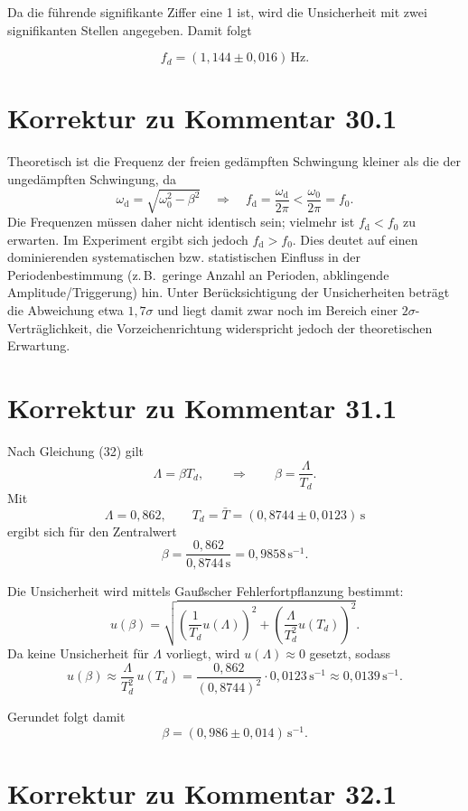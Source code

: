 \documentclass{report}
\begin{document}
\noindent
Da die führende signifikante Ziffer eine 1 ist, wird die Unsicherheit mit zwei signifikanten Stellen angegeben.
Damit folgt

\[
\boxed{f_d = (1{,}144 \pm 0{,}016)\,\mathrm{Hz}}.
\]




\section{Korrektur zu Kommentar 30.1}
Theoretisch ist die Frequenz der freien gedämpften Schwingung kleiner als die der ungedämpften Schwingung, da
\[
\omega_\mathrm d=\sqrt{\omega_0^2-\beta^2}
\quad\Rightarrow\quad
f_\mathrm d=\frac{\omega_\mathrm d}{2\pi}<\frac{\omega_0}{2\pi}=f_0.
\]
Die Frequenzen müssen daher nicht identisch sein; vielmehr ist $f_\mathrm d<f_0$ zu erwarten.
Im Experiment ergibt sich jedoch $f_\mathrm d>f_0$. Dies deutet auf einen dominierenden systematischen bzw. statistischen Einfluss in der Periodenbestimmung (z.\,B.\ geringe Anzahl an Perioden, abklingende Amplitude/Triggerung) hin.
Unter Berücksichtigung der Unsicherheiten beträgt die Abweichung etwa $1{,}7\sigma$ und liegt damit zwar noch im Bereich einer $2\sigma$-Verträglichkeit, die Vorzeichenrichtung widerspricht jedoch der theoretischen Erwartung.

\section{Korrektur zu Kommentar 31.1}

Nach Gleichung (32) gilt
\[
\Lambda=\beta T_d,
\qquad\Rightarrow\qquad
\beta=\frac{\Lambda}{T_d}.
\]
\noindent
Mit
\[
\Lambda=0{,}862,
\qquad
T_d=\bar T=(0{,}8744\pm 0{,}0123)\,\mathrm{s}
\]
ergibt sich für den Zentralwert
\[
\beta=\frac{0{,}862}{0{,}8744\,\mathrm{s}}=0{,}9858\,\mathrm{s^{-1}}.
\]

Die Unsicherheit wird mittels Gaußscher Fehlerfortpflanzung bestimmt:
\[
u(\beta)=\sqrt{\left(\frac{1}{T_d}u(\Lambda)\right)^2+
\left(\frac{\Lambda}{T_d^2}u(T_d)\right)^2}.
\]
Da keine Unsicherheit für $\Lambda$ vorliegt, wird $u(\Lambda)\approx 0$ gesetzt, sodass
\[
u(\beta)\approx \frac{\Lambda}{T_d^2}\,u(T_d)
=\frac{0{,}862}{(0{,}8744)^2}\cdot 0{,}0123\,\mathrm{s^{-1}}
\approx 0{,}0139\,\mathrm{s^{-1}}.
\]

Gerundet folgt damit
\[
\boxed{\beta=(0{,}986\pm 0{,}014)\,\mathrm{s^{-1}}.}
\]
\section{Korrektur zu Kommentar 32.1}
\end{document}
